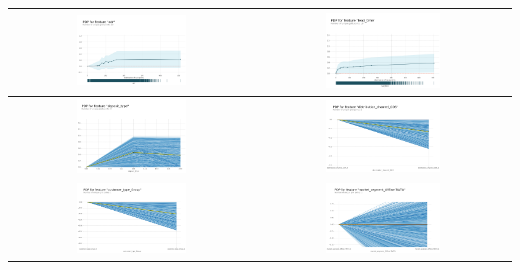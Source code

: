 \begin{tabular}{c|c}
	\arrayrulecolor[rgb]{0.8,0.85,1}
	\includegraphics*[width = 0.47\textwidth]{pics/mypdp1.png} & \includegraphics*[width = 0.47\textwidth]{pics/mypdp2.png}\\
	\hline
	\includegraphics*[width = 0.47\textwidth]{pics/mypdp3.png} & \includegraphics*[width = 0.47\textwidth]{pics/mypdp4.png}\\
	\hline
	\includegraphics*[width = 0.47\textwidth]{pics/mypdp5.png} & \includegraphics*[width = 0.47\textwidth]{pics/mypdp6.png}\\
\end{tabular}\\[2mm]

